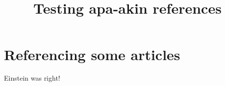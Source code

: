 \documentclass[a4paper]{article}
\title{\Large{\textbf{Testing apa-akin references}}}
\date{}
\author{}
\begin{document}
\section{Referencing some articles}
Einstein \cite{einstein1906} was right!


\end{document}
